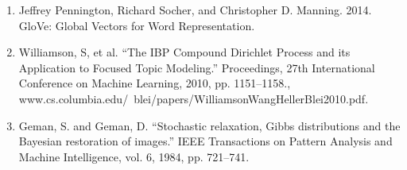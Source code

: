 \documentclass[letterpaper, 11pt]{article}
\begin{document}
\begin{multicols}{2}
\begin{enumerate}
\item Jeffrey Pennington, Richard Socher, and Christopher D. Manning. 2014. GloVe: Global Vectors for Word Representation.

\item Williamson, S, et al. “The IBP Compound Dirichlet Process and its Application to Focused Topic Modeling.” Proceedings, 27th International Conference on Machine Learning, 2010, pp. 1151–1158., www.cs.columbia.edu/~blei/papers/WilliamsonWangHellerBlei2010.pdf.

\item Geman, S. and Geman, D. “Stochastic relaxation, Gibbs distributions and the Bayesian restoration of images.” IEEE Transactions on Pattern Analysis and Machine Intelligence, vol. 6, 1984, pp. 721–741.
\end{enumerate}

\end{multicols}
\end{document}
